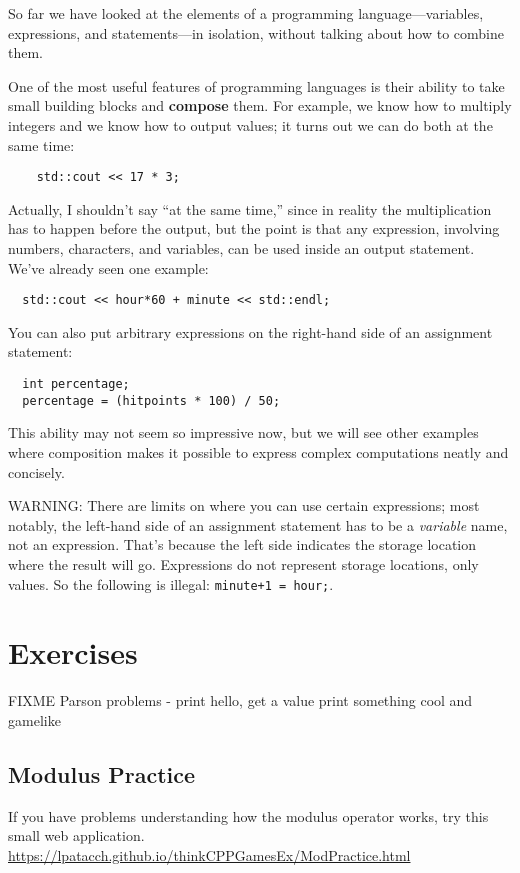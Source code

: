 So far we have looked at the elements of a programming
language---variables, expressions, and statements---in
isolation, without talking about how to combine them.

One of the most useful features of programming languages
is their ability to take small building blocks and
{\bf compose} them.  For example, we know how to multiply
integers and we know how to output values; it turns out we can
do both at the same time:

\begin{verbatim}
    std::cout << 17 * 3;
\end{verbatim}
%
Actually, I shouldn't say ``at the same time,'' since in reality
the multiplication has to happen before the output, but
the point is that any expression, involving numbers, characters,
and variables, can be used inside an output statement.  We've
already seen one example:

\begin{verbatim}
  std::cout << hour*60 + minute << std::endl;
\end{verbatim}
%
You can also put arbitrary expressions on the right-hand
side of an assignment statement:

\begin{lstlisting}
  int percentage;
  percentage = (hitpoints * 100) / 50;
\end{lstlisting}
%
This ability may not seem so impressive now, but we will see
other examples where composition makes it possible
to express complex computations neatly and concisely.

WARNING: There are limits on where you can use certain
expressions; most notably, the left-hand side of an assignment
statement has to be a {\em variable} name, not an expression.
That's because the left side indicates the storage location
where the result will go.  Expressions
do not represent storage locations, only values.  So the
following is illegal:  {\tt minute+1 = hour;}.

\section{Exercises}
FIXME
Parson problems - print hello, get a value
print something cool and gamelike
\subsection{Modulus Practice}
If you have problems understanding how the modulus operator works, try this small web application.
\url{https://lpatacch.github.io/thinkCPPGamesEx/ModPractice.html}
